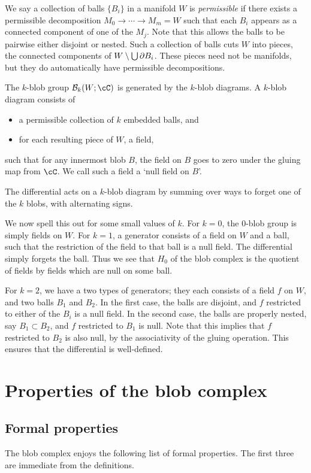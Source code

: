 \documentclass{pnastwo}
\begin{document}
\begin{article}
We say a collection of balls $\{B_i\}$ in a manifold $W$ is \emph{permissible}
if there exists a permissible decomposition $M_0\to\cdots\to M_m = W$ such that
each $B_i$ appears as a connected component of one of the $M_j$. Note that this allows the balls to be pairwise either disjoint or nested. Such a collection of balls cuts $W$ into pieces, the connected components of $W \setminus \bigcup \partial B_i$. These pieces need not be manifolds, but they do automatically have permissible decompositions.

The $k$-blob group $\bc_k(W; \cC)$ is generated by the $k$-blob diagrams. A $k$-blob diagram consists of
\begin{itemize}
\item a permissible collection of $k$ embedded balls, and
\item for each resulting piece of $W$, a field,
\end{itemize}
such that for any innermost blob $B$, the field on $B$ goes to zero under the gluing map from $\cC$. We call such a field a `null field on $B$'.

The differential acts on a $k$-blob diagram by summing over ways to forget one of the $k$ blobs, with alternating signs.

We now spell this out for some small values of $k$. For $k=0$, the $0$-blob group is simply fields on $W$. For $k=1$, a generator consists of a field on $W$ and a ball, such that the restriction of the field to that ball is a null field. The differential simply forgets the ball. Thus we see that $H_0$ of the blob complex is the quotient of fields by fields which are null on some ball.

For $k=2$, we have a two types of generators; they each consists of a field $f$ on $W$, and two balls $B_1$ and $B_2$. In the first case, the balls are disjoint, and $f$ restricted to either of the $B_i$ is a null field. In the second case, the balls are properly nested, say $B_1 \subset B_2$, and $f$ restricted to $B_1$ is null. Note that this implies that $f$ restricted to $B_2$ is also null, by the associativity of the gluing operation. This ensures that the differential is well-defined.

\section{Properties of the blob complex}
\subsection{Formal properties}
\label{sec:properties}
The blob complex enjoys the following list of formal properties. The first three are immediate from the definitions.


\end{article}
\end{document}
